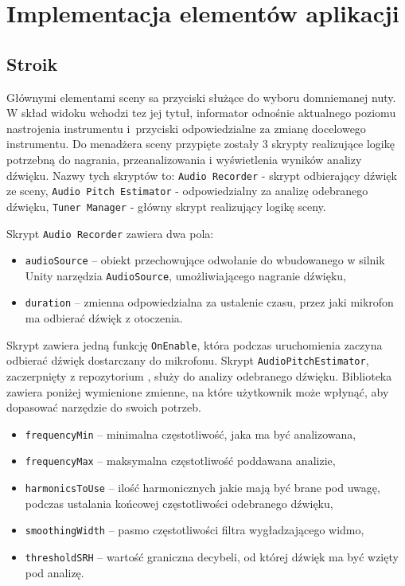 \section{Implementacja elementów aplikacji}

\subsection{Stroik}

Głównymi elementami sceny sa przyciski służące do wyboru domniemanej nuty. W skład widoku wchodzi tez jej tytuł, informator odnośnie aktualnego poziomu nastrojenia instrumentu i~przyciski odpowiedzialne za zmianę docelowego instrumentu. Do menadżera sceny przypięte zostały 3 skrypty realizujące logikę potrzebną do nagrania, przeanalizowania i wyświetlenia wyników analizy dźwięku. Nazwy tych skryptów to: \texttt{Audio Recorder} - skrypt odbierający dźwięk ze sceny, \texttt{Audio Pitch Estimator} - odpowiedzialny za analizę odebranego dźwięku, \texttt{Tuner Manager} - główny skrypt realizujący logikę sceny. 

Skrypt \texttt{Audio Recorder} zawiera dwa pola:
\begin{itemize}
    \item \texttt{audioSource} -- obiekt przechowujące odwołanie do wbudowanego w silnik Unity narzędzia \texttt{AudioSource}, umożliwiającego nagranie dźwięku,
    \item \texttt{duration} -- zmienna odpowiedzialna za ustalenie czasu, przez jaki mikrofon ma odbierać dźwięk z otoczenia.
\end{itemize}

Skrypt zawiera jedną funkcję \texttt{OnEnable}, która podczas uruchomienia zaczyna odbierać dźwięk dostarczany do mikrofonu. Skrypt \texttt{AudioPitchEstimator}, zaczerpnięty z repozytorium \cite{AudioPitchEstimator}, %
służy do analizy odebranego dźwięku. Biblioteka zawiera poniżej wymienione zmienne, na które użytkownik może wpłynąć, aby dopasować narzędzie do swoich potrzeb.



\begin{itemize}
    \item \texttt{frequencyMin} -- minimalna częstotliwość, jaka ma być analizowana,
    \item \texttt{frequencyMax} -- maksymalna częstotliwość poddawana analizie,
    \item \texttt{harmonicsToUse} -- ilość harmonicznych jakie mają być brane pod uwagę, podczas ustalania końcowej częstotliwości odebranego dźwięku,
    \item \texttt{smoothingWidth} -- pasmo częstotliwości filtra wygładzającego widmo,
    \item \texttt{thresholdSRH} -- wartość graniczna decybeli, od której dźwięk ma być wzięty pod analizę.
\end{itemize}


